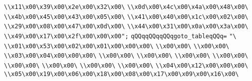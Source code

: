 \verb|\\x11\x00\x39\x00\x2e\x00\x32\x00\|\newline
\verb|\\x0d\x00\x4c\x00\x4a\x00\x48\x00\|\newline
\verb|\\x4b\x00\x45\x00\x43\x00\x05\x00\|\newline
\verb|\\x41\x00\x40\x00\x1c\x00\x02\x00\|\newline
\verb|\\x29\x00\x08\x00\x47\x00\x0d\x00\|\newline
\verb|\\x44\x00\x31\x00\x0a\x00\x3a\x00\|\newline
\verb|\\x49\x00\x17\x00\x2f\x00\x00\x00";|\newline
\verb|qQQqqQQqqQQqgoto_tableqQQq=|\newline
\verb|"\|\newline
\verb|\\x01\x00\x53\x00\x02\x00\x01\x00\x00\x00\|\newline
\verb|\\x00\x00\|\newline
\verb|\\x00\x00\|\newline
\verb|\\x03\x00\x04\x00\x00\x00\|\newline
\verb|\\x00\x00\|\newline
\verb|\\x00\x00\|\newline
\verb|\\x00\x00\|\newline
\verb|\\x00\x00\|\newline
\verb|\\x00\x00\|\newline
\verb|\\x00\x00\|\newline
\verb|\\x00\x00\|\newline
\verb|\\x00\x00\|\newline
\verb|\\x04\x00\x12\x00\x00\x00\|\newline
\verb|\\x05\x00\x19\x00\x06\x00\x18\x00\x08\x00\x17\x00\x09\x00\x16\x00\|\newline
